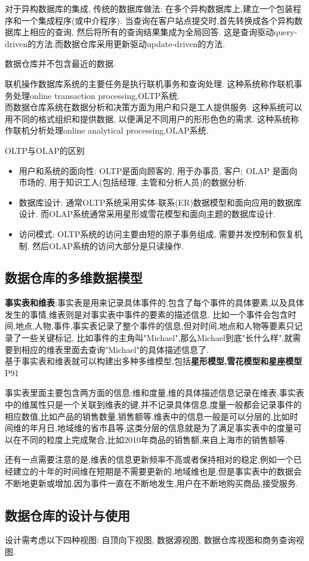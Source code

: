 \documentclass{article}
\begin{document}
对于异构数据库的集成, 传统的数据库做法: 在多个异构数据库上,建立一个包装程序和一个集成程序(或中介程序). 当查询在客户站点提交时,首先转换成各个异构数据库上相应的查询, 然后将所有的查询结果集成为全局回答. 这是查询驱动query-driven的方法.而数据仓库采用更新驱动update-driven的方法.\par
数据仓库并不包含最近的数据.

联机操作数据库系统的主要任务是执行联机事务和查询处理. 这种系统称作联机事务处理online transaction processing,OLTP系统. \\
而数据仓库系统在数据分析和决策方面为用户和只是工人提供服务. 这种系统可以用不同的格式组织和提供数据, 以便满足不同用户的形形色色的需求. 这种系统称作联机分析处理online analytical processing,OLAP系统.\par
OLTP与OLAP的区别
\begin{itemize}
	\item 用户和系统的面向性: OLTP是面向顾客的, 用于办事员, 客户; OLAP 是面向市场的, 用于知识工人(包括经理, 主管和分析人员)的数据分析.
	\item 数据库设计: 通常OLTP系统采用实体-联系(ER)数据模型和面向应用的数据库设计. 而OLAP系统通常采用星形或雪花模型和面向主题的数据库设计.
	\item 访问模式: OLTP系统的访问主要由短的原子事务组成, 需要并发控制和恢复机制. 然后OLAP系统的访问大部分是只读操作.
\end{itemize}

\subsection{数据仓库的多维数据模型}
\textbf{事实表和维表}:事实表是用来记录具体事件的,包含了每个事件的具体要素,以及具体发生的事情,维表则是对事实表中事件的要素的描述信息.
比如一个事件会包含时间,地点,人物,事件,事实表记录了整个事件的信息,但对时间,地点和人物等要素只记录了一些关键标记,
比如事件的主角叫"Michael",那么Michael到底"长什么样",就需要到相应的维表里面去查询"Michael"的具体描述信息了.\\
基于事实表和维表就可以构建出多种多维模型,包括\textbf{星形模型,雪花模型和星座模型}P91

事实表里面主要包含两方面的信息:维和度量,维的具体描述信息记录在维表,事实表中的维属性只是一个关联到维表的键,并不记录具体信息,度量一般都会记录事件的相应数值,比如产品的销售数量,销售额等.维表中的信息一般是可以分层的,比如时间维的年月日,地域维的省市县等,这类分层的信息就是为了满足事实表中的度量可以在不同的粒度上完成聚合,比如2010年商品的销售额,来自上海市的销售额等.

还有一点需要注意的是,维表的信息更新频率不高或者保持相对的稳定,例如一个已经建立的十年的时间维在短期是不需要更新的,地域维也是,但是事实表中的数据会不断地更新或增加,因为事件一直在不断地发生,用户在不断地购买商品,接受服务.

\subsection{数据仓库的设计与使用}
设计需考虑以下四种视图: 自顶向下视图, 数据源视图, 数据仓库视图和商务查询视图.
\end{document}
